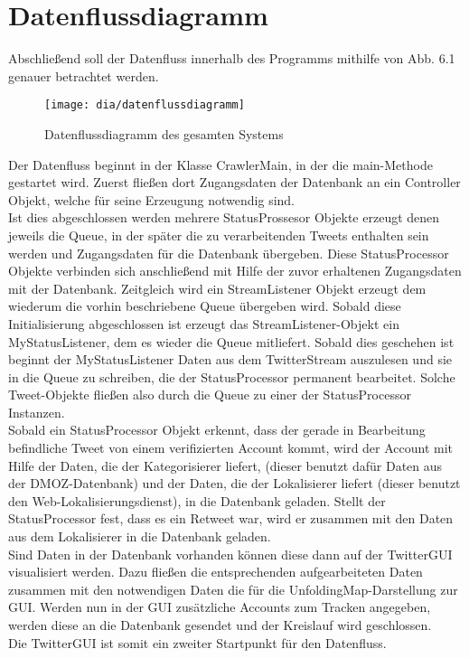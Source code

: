 \section{Datenflussdiagramm}
Abschließend soll der Datenfluss innerhalb des Programms mithilfe von Abb. 6.1 genauer betrachtet werden.

\begin{figure}[h!]
	\centering
	\texttt{[image: dia/datenflussdiagramm]}
	\caption{Datenflussdiagramm des gesamten Systems}
	\label{fig:datenflussdiagramm}
\end{figure}
Der Datenfluss beginnt in der Klasse CrawlerMain, in der die main-Methode gestartet wird. Zuerst fließen dort Zugangsdaten der Datenbank an ein Controller Objekt, welche für seine Erzeugung notwendig sind. \\
Ist dies abgeschlossen werden mehrere StatusProssesor Objekte erzeugt denen jeweils die Queue, in der später die zu verarbeitenden Tweets enthalten sein werden und Zugangsdaten für die Datenbank übergeben. Diese StatusProcessor Objekte verbinden sich anschließend mit Hilfe der zuvor erhaltenen Zugangsdaten mit der Datenbank. Zeitgleich wird ein StreamListener Objekt erzeugt dem wiederum die vorhin beschriebene Queue übergeben wird. Sobald diese Initialisierung abgeschlossen ist erzeugt das StreamListener-Objekt ein MyStatusListener, dem es wieder die Queue mitliefert. Sobald dies geschehen ist beginnt der MyStatusListener Daten aus dem TwitterStream auszulesen und sie in die Queue zu schreiben, die der StatusProcessor permanent bearbeitet. Solche Tweet-Objekte fließen also durch die Queue zu einer der StatusProcessor Instanzen. \\
Sobald ein StatusProcessor Objekt erkennt, dass der gerade in Bearbeitung befindliche Tweet von einem verifizierten Account kommt, wird der Account mit Hilfe der Daten, die der Kategorisierer liefert, (dieser benutzt dafür Daten aus der DMOZ-Datenbank) und der Daten, die der Lokalisierer liefert (dieser benutzt den Web-Lokalisierungsdienst), in die Datenbank geladen. Stellt der StatusProcessor fest, dass es ein Retweet war, wird er zusammen mit den Daten aus dem Lokalisierer in die Datenbank geladen.\\
Sind Daten in der Datenbank vorhanden können diese dann auf der TwitterGUI visualisiert werden. Dazu fließen die entsprechenden aufgearbeiteten Daten zusammen mit den notwendigen Daten die für die UnfoldingMap-Darstellung zur GUI. Werden nun in der GUI zusätzliche Accounts zum Tracken angegeben, werden diese an die Datenbank gesendet und der Kreislauf wird geschlossen.\\
Die TwitterGUI ist somit ein zweiter Startpunkt für den Datenfluss.	
